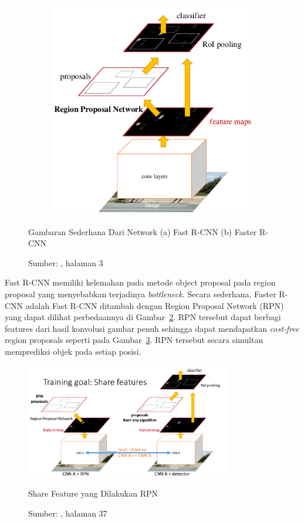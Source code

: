 \begin{figure}[ht]
\begin{subfigure}[b]{0.47\textwidth}
    \includegraphics[width=\textwidth]{fasterrcnn_rpn}
    \caption{}
    \label{fig:faster}
  \end{subfigure}
  \caption{Gambaran Sederhana Dari Network (a) Fast R-CNN (b) Faster R-CNN}
  \caption*{Sumber: \citet{ren2015faster}, halaman 3}
  \label{fig:fasterrcnn_rpn}
\end{figure}

Fast R-CNN memiliki kelemahan pada metode object proposal pada region proposal yang menyebabkan terjadinya \textit{bottleneck}. Secara sederhana, Faster R-CNN adalah Fast R-CNN ditambah dengan Region Proposal Network (RPN) yang dapat dilihat perbedaannya di Gambar~\ref{fig:fasterrcnn_rpn}. RPN tersebut dapat berbagi features dari hasil konvolusi gambar penuh sehingga dapat mendapatkan \textit{cost-free} region proposals seperti pada Gambar~\ref{fig:share_features}. RPN tersebut secara simultan memprediksi objek pada setiap posisi.

\begin{figure}[ht]
\centering
 \includegraphics[width=0.8\textwidth]{share_features}
 \caption{Share Feature yang Dilakukan RPN}
  \caption*{Sumber: \citet{girshick2015tutorial}, halaman 37}
 \label{fig:share_features}   
\end{figure}

